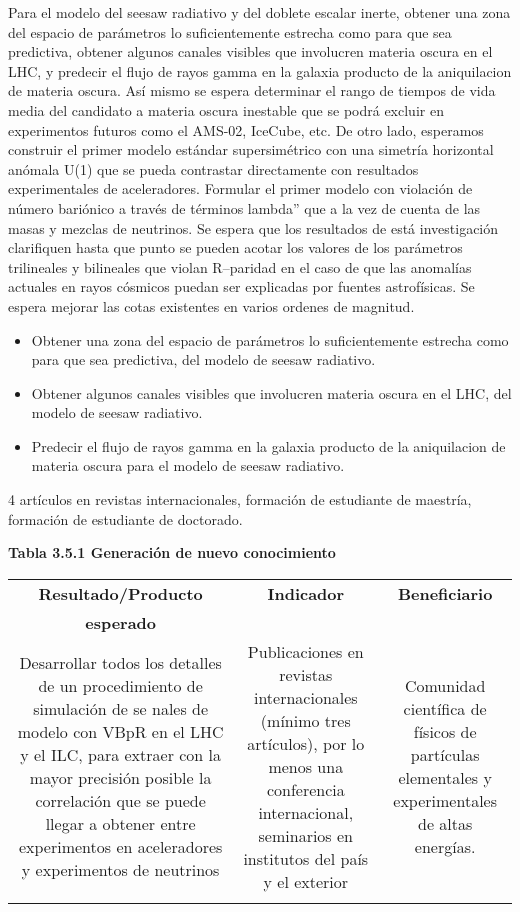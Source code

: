 \begin{ideas}
\newpage{}

Para el modelo del seesaw radiativo y del doblete escalar inerte, obtener una zona del espacio de parámetros lo suficientemente estrecha como para que sea predictiva, obtener algunos canales visibles que involucren materia oscura en el LHC, y predecir el flujo de rayos gamma en la galaxia producto de la aniquilacion de materia oscura.
Así mismo se espera determinar el rango de tiempos de vida media del candidato a materia oscura inestable que se podrá excluir en experimentos futuros como el AMS-02, IceCube, etc.
De otro lado, esperamos construir el primer modelo estándar supersimétrico con una simetría horizontal anómala U(1) que se pueda contrastar directamente con resultados experimentales de aceleradores. 
Formular el primer modelo con violación de número bariónico a través de términos lambda'' que a la vez de cuenta de las masas y mezclas de neutrinos.
Se espera que los resultados de está investigación clarifiquen hasta que punto se pueden acotar los valores de los parámetros trilineales y bilineales que violan R--paridad en el caso de que las anomalías actuales en rayos cósmicos puedan ser explicadas por fuentes astrofísicas. Se espera mejorar las cotas existentes en varios ordenes de magnitud. 


\begin{itemize}
 \item Obtener una zona del espacio de parámetros lo suficientemente estrecha como para que sea predictiva, del modelo de seesaw radiativo.
 \item Obtener algunos canales visibles que involucren materia oscura en el LHC, del modelo de seesaw radiativo.
 \item Predecir el flujo de rayos gamma en la galaxia producto de la aniquilacion de materia oscura para el modelo de seesaw radiativo.
\end{itemize}

4 artículos en revistas internacionales, formación de estudiante de
maestría, formación de estudiante de doctorado.

\textbf{Tabla 3.5.1 Generación de nuevo conocimiento}\\
\begin{tabular}{|c|c|c|}\hline
   \textbf{Resultado/Producto}&\textbf{Indicador} & \textbf{Beneficiario}\\
   \textbf{esperado}& & \\\hline
   \parbox[t]{4cm}{Desarrollar todos los detalles de un procedimiento de simulación de se nales de modelo con VBpR en el LHC y el ILC, para extraer con la mayor precisión posible la correlación que se puede llegar a obtener entre experimentos en aceleradores y experimentos de neutrinos}& \parbox[t]{4cm}{Publicaciones en revistas internacionales (mínimo tres artículos), por lo menos una conferencia internacional, seminarios en institutos del país y el exterior}& \parbox[t]{4cm}{Comunidad científica de físicos de partículas elementales y experimentales de altas energías.}\\\hline 
   & & \\\hline
 \end{tabular}


\end{ideas}
